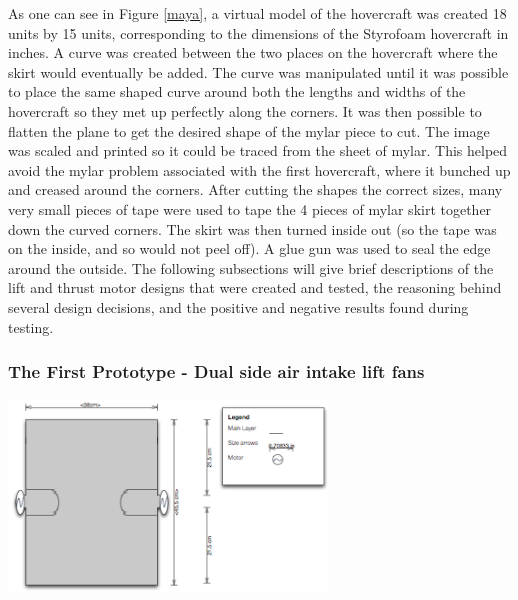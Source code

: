 As one can see in Figure \ref{maya}, a virtual model of the hovercraft was created 18 units by 15 units, corresponding
to the dimensions of the Styrofoam hovercraft in inches.  A curve was created between the two places on the hovercraft where the skirt would eventually be added.
The curve was manipulated until it was possible to place the same shaped curve around both the lengths and widths of the hovercraft
so they met up perfectly along the corners. It was then possible to flatten the plane to get the desired shape of the mylar piece 
to cut. The image was scaled and printed so it could be traced from the sheet of mylar. This helped avoid the mylar
problem associated with the first hovercraft, where it bunched up and creased around the corners. After cutting the shapes the correct sizes,  many very small pieces of tape were used to tape the 4 pieces of mylar skirt together down the curved corners.  The skirt was then turned inside out (so the tape was on the inside,
and so would not peel off).  A glue gun was used to seal the edge around the outside.  The following subsections will give
brief descriptions of the lift and thrust motor designs that were created and tested, the reasoning behind several design decisions, and the positive and negative results found during testing.

\subsubsection{The First Prototype - Dual side air intake lift fans}

\begin{minipage}{6.5in}
\begin{center}
  \includegraphics[width=85mm]{imageSources/top2.png}
\end{center}
\label{top2}
\end{minipage}

